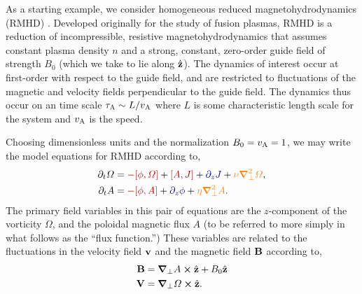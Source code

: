 \documentclass[12pt]{memoir}
\begin{document}
%
As a starting example, we consider homogeneous reduced magnetohydrodynamics
(RMHD) \citep{KadomtsevPogutse74, Strauss76, Strauss77}. Developed originally
for the study of fusion plasmas, RMHD is a reduction of incompressible,
resistive magnetohydrodynamics that assumes constant plasma density $n$
and a strong, constant, zero-order guide field of strength $B_0$ (which we
take to lie along $\hat{\mathbf{z}}$). The dynamics of interest occur at first-order
with respect to the guide field, and are restricted to fluctuations
of the magnetic and velocity fields perpendicular to the guide field.
The dynamics thus occur on an \Alfven time scale
$\tau_{\mathrm{A}}\sim L/v_{\mathrm{A}}$ where $L$ is some characteristic length scale
for the system and $v_{\mathrm{A}}$ is the \Alfven speed.
%
\par
%
Choosing dimensionless units and the normalization $B_0=v_{\mathrm{A}}=1$, 
we may write the model equations for RMHD according to,
%
\begin{subequations}
\begin{align}
  \pardt\Omega &={\color{red!65!black}-[\phi,\Omega]} + {\color{red!65!black}[A,J]} 
                                                      + {\color{blue!65!black}\pardz J}   
                                                                                        + {\color{orange}\nu \delperp^2\Omega},\label{eq:rmhdvort}  \\
  \pardt A     &={\color{red!65!black}-[\phi,A]}      
                                                      + {\color{blue!65!black}\pardz\phi} 
                                                                                        + {\color{orange}\eta\delperp^2 A}     \label{eq:rmhdflux}.
\end{align}
\end{subequations}
%
The primary field variables in this pair of equations are the $z$-component
of the vorticity $\Omega$, and the poloidal magnetic flux $A$ (to be referred
to more simply in what follows as the ``flux function.'') These variables
are related to the fluctuations in the velocity field $\mathbf{v}$ and
the magnetic field $\mathbf{B}$ according to,
%
\begin{subequations}
\begin{align}
  \mathbf{B}        &= \boldsymbol{\nabla}_\perp A      \boldsymbol{\times} \hat{\mathbf{z}} + B_0\hat{\mathbf{z}} \label{eq:rmhdbfroma}      \\
  \mathbf{V}        &= \boldsymbol{\nabla}_\perp \Omega \boldsymbol{\times} \hat{\mathbf{z}}            \label{eq:rmhdvfromomega}.
\end{align}
\end{subequations}
\end{document}
